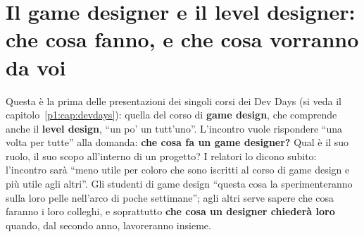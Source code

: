 %

\chapter[Il game designer e il level designer]{Il game designer e il
level designer: che cosa fanno, e che cosa vorranno da voi}
\label{p2:cap:gamedesign}

Questa è la prima delle presentazioni dei singoli corsi dei Dev Days (si
veda il capitolo~\ref{p1:cap:devdays}): quella del corso di \textbf{game
design}, che comprende anche il \textbf{level design}, ``un po' un tutt'uno''.
L'incontro vuole rispondere ``una volta per tutte'' alla domanda: \textbf{che
cosa fa un game designer?} Qual è il suo ruolo, il suo scopo all'interno di
un progetto? I relatori lo dicono subito: l'incontro sarà ``meno utile per
coloro che sono iscritti al corso di game design e più utile agli altri''.
Gli studenti di game design ``questa cosa la sperimenteranno sulla loro pelle
nell'arco di poche settimane''; agli altri serve sapere che cosa faranno i
loro colleghi, e soprattutto \textbf{che cosa un designer chiederà loro}
quando, dal secondo anno, lavoreranno insieme.

